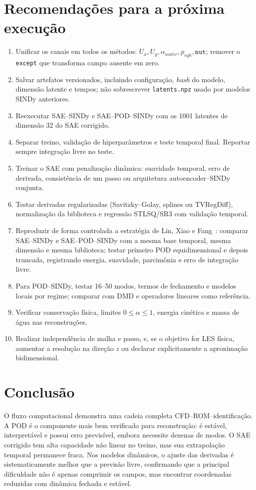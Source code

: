\documentclass[12pt,a4paper]{article}
\newcommand{\code}[1]{\texttt{#1}}
\begin{document}
\section{Recomendações para a próxima execução}
\begin{enumerate}
  \item Unificar os canais em todos os métodos: $U_x,U_y,\alpha_{water},p_{rgh},\code{nut}$; remover o \code{except} que transforma campo ausente em zero.
  \item Salvar artefatos versionados, incluindo configuração, \emph{hash} do modelo, dimensão latente e tempos; não sobrescrever \code{latents.npz} usado por modelos SINDy anteriores.
  \item Reexecutar SAE--SINDy e SAE--POD--SINDy com os 1001 latentes de dimensão 32 do SAE corrigido.
  \item Separar treino, validação de hiperparâmetros e teste temporal final. Reportar sempre integração livre no teste.
  \item Treinar o SAE com penalização dinâmica: suavidade temporal, erro de derivada, consistência de um passo ou arquitetura autoencoder--SINDy conjunta.
  \item Testar derivadas regularizadas (Savitzky--Golay, splines ou TVRegDiff), normalização da biblioteca e regressão STLSQ/SR3 com validação temporal.
  \item Reproduzir de forma controlada a estratégia de Lin, Xiao e Fang~\cite{lin2024}: comparar SAE--SINDy e SAE--POD--SINDy com a mesma base temporal, mesma dimensão e mesma biblioteca; testar primeiro POD equidimensional e depois truncada, registrando energia, suavidade, parcimônia e erro de integração livre.
  \item Para POD--SINDy, testar 16--50 modos, termos de fechamento e modelos locais por regime; comparar com DMD e operadores lineares como referência.
  \item Verificar conservação física, limites $0\le\alpha\le1$, energia cinética e massa de água nas reconstruções.
  \item Realizar independência de malha e passo, e, se o objetivo for LES física, aumentar a resolução na direção $z$ ou declarar explicitamente a aproximação bidimensional.
\end{enumerate}

\section{Conclusão}
O fluxo computacional demonstra uma cadeia completa CFD--ROM--identificação. A POD é o componente mais bem verificado para reconstrução: é estável, interpretável e possui erro previsível, embora necessite dezenas de modos. O SAE corrigido tem alta capacidade não linear no treino, mas sua extrapolação temporal permanece fraca. Nos modelos dinâmicos, o ajuste das derivadas é sistematicamente melhor que a previsão livre, confirmando que a principal dificuldade não é apenas comprimir os campos, mas encontrar coordenadas reduzidas com dinâmica fechada e estável.
\end{document}
